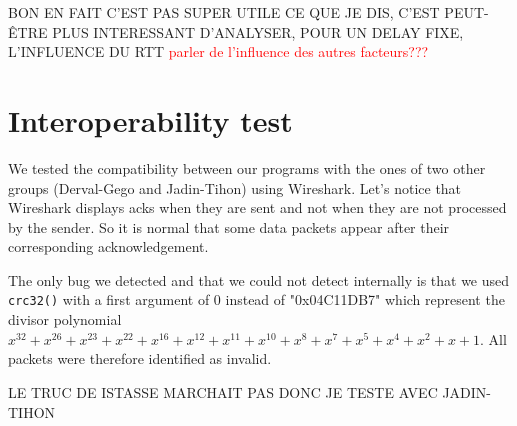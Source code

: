 \documentclass[11pt,a4paper]{article}
\begin{document}
BON EN FAIT C'EST PAS SUPER UTILE CE QUE JE DIS, C'EST PEUT-ÊTRE PLUS INTERESSANT D'ANALYSER, POUR UN DELAY FIXE, L'INFLUENCE DU RTT
\textcolor{red}{parler de l'influence des autres facteurs???}

\section{Interoperability test }

We tested the compatibility between our programs with the ones of two other groups (Derval-Gego and Jadin-Tihon) using Wireshark. Let's notice that Wireshark displays acks when they are sent and not when they are not processed by the sender. So it is normal that some data packets appear after their corresponding acknowledgement.

The only bug we detected and that we could not detect internally is that we used \texttt{crc32()} with a first argument of $0$ instead of "0x04C11DB7" which represent the divisor polynomial $x^{32} +x^{26} +x^{23} +x^{22} +x^{16} +x^{12} +x^{11} +x^{10} +x^{8} + x^{7} + x^{5} + x^{4} + x^{2} + x + 1$. All packets were therefore identified as invalid.
 
LE TRUC DE ISTASSE MARCHAIT PAS DONC JE TESTE AVEC JADIN-TIHON
\end{document}
